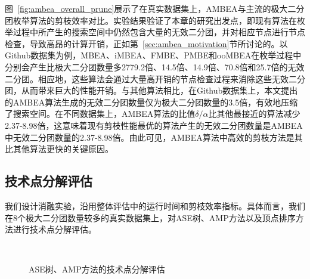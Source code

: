 图~\ref{fig:ambea_overall_prune}展示了在真实数据集上，AMBEA与主流的极大二分团枚举算法的剪枝效率对比。实验结果验证了本章的研究出发点，即现有算法在枚举过程中所产生的搜索空间中仍然包含大量的无效二分团，并对相应节点进行节点检查，导致高昂的计算开销，正如第~\ref{sec:ambea_motivation}节所讨论的。以Github数据集为例，MBEA、iMBEA、FMBE、PMBE和ooMBEA在枚举过程中分别会产生比极大二分团数量多2779.2倍、14.5倍、14.9倍、70.8倍和25.7倍的无效二分团。相应地，这些算法会通过大量高开销的节点检查过程来消除这些无效二分团，从而带来巨大的性能开销。与其他算法相比，在Github数据集上，本文提出的AMBEA算法生成的无效二分团数量仅为极大二分团数量的3.5倍，有效地压缩了搜索空间。在不同数据集上，AMBEA算法的比值$\delta/\alpha$比其他最接近的算法减少2.37-8.98倍，这意味着现有剪枝性能最优的算法产生的无效二分团数量是AMBEA中无效二分团数量的2.37-8.98倍。由此可见，AMBEA算法中高效的剪枝方法是其比其他算法更快的关键原因。







\subsection{技术点分解评估}

我们设计消融实验，沿用整体评估中的运行时间和剪枝效率指标。具体而言，我们在8个极大二分团数量较多的真实数据集上，对ASE树、AMP方法以及顶点排序方法进行技术点分解评估。


\begin{figure} [t]
	\centering
  \vspace{0.05in}
  \\
  \vspace{0.05in}
	\caption{ASE树、AMP方法的技术点分解评估}
	\label{fig:ambea_opt}
\end{figure}



